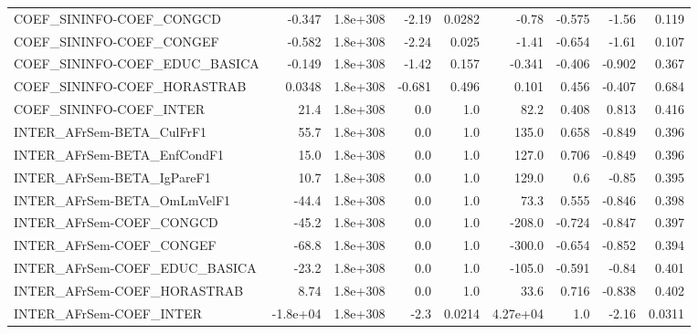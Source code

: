 \begin{tabular}{lrrrrrrrr}
COEF\_SININFO-COEF\_CONGCD              &      -0.347 &     1.8e+308 &   -2.19 &   0.0282 &      -0.78 &      -0.575 &        -1.56 &         0.119 \\
COEF\_SININFO-COEF\_CONGEF              &      -0.582 &     1.8e+308 &   -2.24 &    0.025 &      -1.41 &      -0.654 &        -1.61 &         0.107 \\
COEF\_SININFO-COEF\_EDUC\_BASICA         &      -0.149 &     1.8e+308 &   -1.42 &    0.157 &     -0.341 &      -0.406 &       -0.902 &         0.367 \\
COEF\_SININFO-COEF\_HORASTRAB           &      0.0348 &     1.8e+308 &  -0.681 &    0.496 &      0.101 &       0.456 &       -0.407 &         0.684 \\
COEF\_SININFO-COEF\_INTER               &        21.4 &     1.8e+308 &     0.0 &      1.0 &       82.2 &       0.408 &        0.813 &         0.416 \\
INTER\_AFrSem-BETA\_CulFrF1             &        55.7 &     1.8e+308 &     0.0 &      1.0 &      135.0 &       0.658 &       -0.849 &         0.396 \\
INTER\_AFrSem-BETA\_EnfCondF1           &        15.0 &     1.8e+308 &     0.0 &      1.0 &      127.0 &       0.706 &       -0.849 &         0.396 \\
INTER\_AFrSem-BETA\_IgPareF1            &        10.7 &     1.8e+308 &     0.0 &      1.0 &      129.0 &         0.6 &        -0.85 &         0.395 \\
INTER\_AFrSem-BETA\_OmLmVelF1           &       -44.4 &     1.8e+308 &     0.0 &      1.0 &       73.3 &       0.555 &       -0.846 &         0.398 \\
INTER\_AFrSem-COEF\_CONGCD              &       -45.2 &     1.8e+308 &     0.0 &      1.0 &     -208.0 &      -0.724 &       -0.847 &         0.397 \\
INTER\_AFrSem-COEF\_CONGEF              &       -68.8 &     1.8e+308 &     0.0 &      1.0 &     -300.0 &      -0.654 &       -0.852 &         0.394 \\
INTER\_AFrSem-COEF\_EDUC\_BASICA         &       -23.2 &     1.8e+308 &     0.0 &      1.0 &     -105.0 &      -0.591 &        -0.84 &         0.401 \\
INTER\_AFrSem-COEF\_HORASTRAB           &        8.74 &     1.8e+308 &     0.0 &      1.0 &       33.6 &       0.716 &       -0.838 &         0.402 \\
INTER\_AFrSem-COEF\_INTER               &    -1.8e+04 &     1.8e+308 &    -2.3 &   0.0214 &   4.27e+04 &         1.0 &        -2.16 &        0.0311 \\

\end{tabular}
